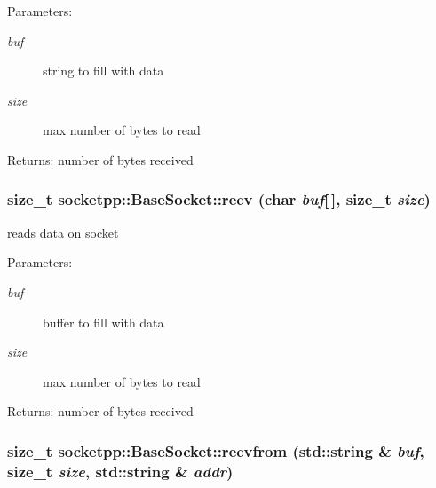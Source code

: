 \begin{CompactItemize}
\begin{Desc}
\item[Parameters:]
\begin{description}
\item[{\em buf}]string to fill with data \item[{\em size}]max number of bytes to read \end{description}
\end{Desc}
\begin{Desc}
\item[Returns:]number of bytes received \end{Desc}
\hypertarget{classsocketpp_1_1BaseSocket_08b3e29d019575293fa134c6d91d6cbb}{
\subsubsection[{recv}]{\setlength{\rightskip}{0pt plus 5cm}size\_\-t socketpp::BaseSocket::recv (char {\em buf}\mbox{[}$\,$\mbox{]}, \/  size\_\-t {\em size})}}
\label{classsocketpp_1_1BaseSocket_08b3e29d019575293fa134c6d91d6cbb}


reads data on socket 

\begin{Desc}
\item[Parameters:]
\begin{description}
\item[{\em buf}]buffer to fill with data \item[{\em size}]max number of bytes to read \end{description}
\end{Desc}
\begin{Desc}
\item[Returns:]number of bytes received \end{Desc}
\hypertarget{classsocketpp_1_1BaseSocket_ace82407e13a6eee26aa1f5f642d0cfc}{
\subsubsection[{recvfrom}]{\setlength{\rightskip}{0pt plus 5cm}size\_\-t socketpp::BaseSocket::recvfrom (std::string \& {\em buf}, \/  size\_\-t {\em size}, \/  std::string \& {\em addr})}}
\label{classsocketpp_1_1BaseSocket_ace82407e13a6eee26aa1f5f642d0cfc}



\end{CompactItemize}
